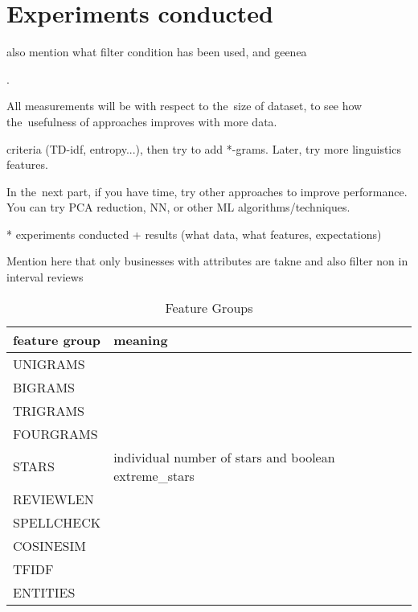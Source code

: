 \chapter{Experiments conducted}

also mention what filter condition has been used, and geenea


\label{chap:exp}

.

All measurements will be with respect to the~size of dataset, to see how the~usefulness of approaches improves with more data.

criteria (TD-idf, entropy...), then try to add *-grams. Later, try more linguistics features.

In the~next part, if you have time, try other approaches to improve performance. You can try PCA reduction, NN, or other ML algorithms/techniques.

* experiments conducted + results (what data, what features, expectations)

\cite{Andel07}


Mention here that only businesses with attributes are takne
and also filter non in interval reviews


\begin{table}[h]
\centering
\begin{tabular}{lll}
\toprule
\textbf{feature group} & \textbf{meaning}\\
\midrule
UNIGRAMS & \\
BIGRAMS & \\
TRIGRAMS & \\
FOURGRAMS & \\
STARS & individual number of stars and boolean extreme\_stars\\
REVIEWLEN & \\
SPELLCHECK & \\
COSINESIM & \\
TFIDF & \\
ENTITIES & \\
\bottomrule
\end{tabular}

\caption{Feature Groups}\label{tab:fea_grp}
\end{table}
